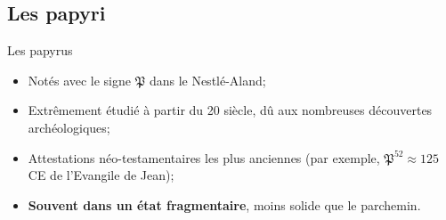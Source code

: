 \documentclass[11pt]{beamer}
\begin{document}
\subsection{Les papyri}


\begin{frame}{Les papyrus}
    \begin{itemize}
        \item Notés avec le signe $\mathfrak{P}$ dans le Nestlé-Aland;
        \item Extrêmement étudié à partir du 20\ieme{} siècle, dû aux nombreuses découvertes archéologiques;
        \item Attestations néo-testamentaires les plus anciennes (par exemple, $\mathfrak{P}^{52} \approx 125$ CE de l'Evangile de Jean);
        \item \textbf{Souvent dans un état fragmentaire}, moins solide que le parchemin.
    \end{itemize}
\end{frame}
\end{document}
